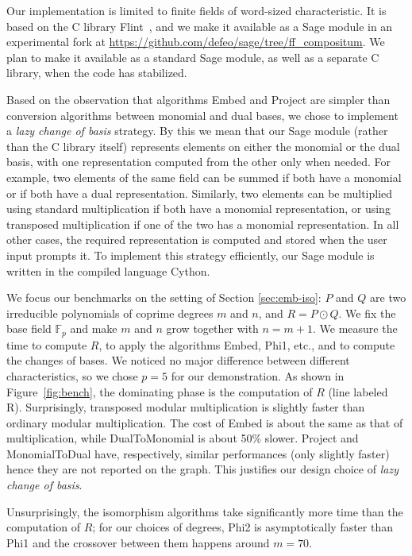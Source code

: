 \documentclass{sig-alternate}
\def\F {\ensuremath{\mathbb{F}}}
\newcounter{algo}
\begin{document}
Our implementation is limited to finite fields of word-sized
characteristic.  It is based on the C library
Flint~\cite{hart2010flint}, and we make it available as a Sage module
in an experimental fork at
\url{https://github.com/defeo/sage/tree/ff_compositum}. We plan to
make it available as a standard Sage module, as well as a separate C
library, when the code has stabilized.

Based on the observation that algorithms {\sf Embed} and {\sf Project}
are simpler than conversion algorithms between monomial and dual
bases, we chose to implement a \emph{lazy change of basis}
strategy. By this we mean that our Sage module (rather than the C
library itself) represents elements on either the monomial or the dual
basis, with one representation computed from the other only when
needed. For example, two elements of the same field can be summed if
both have a monomial or if both have a dual representation. Similarly,
two elements can be multiplied using standard multiplication if both
have a monomial representation, or using transposed multiplication if
one of the two has a monomial representation. In all other cases, the
required representation is computed and stored when the user input
prompts it. To implement this strategy efficiently, our Sage module is
written in the compiled language Cython.

We focus our benchmarks on the setting of Section \ref{sec:emb-iso}:
$P$ and $Q$ are two irreducible polynomials of coprime degrees $m$ and
$n$, and $R=P\odot Q$. We fix the base field $\F_p$ and make $m$ and
$n$ grow together with $n=m+1$. We measure the time to compute $R$, to
apply the algorithms {\sf Embed}, {\sf Phi1}, etc., and to compute the
changes of bases. We noticed no major difference between different
characteristics, so we chose $p=5$ for our demonstration. As shown in
Figure~\ref{fig:bench}, the dominating phase is the computation of $R$
(line labeled {\sf R}). Surprisingly, transposed modular
multiplication is slightly faster than ordinary modular
multiplication. The cost of {\sf Embed} is about the same as that of
multiplication, while {\sf DualToMonomial} is about 50\% slower. {\sf
  Project} and {\sf MonomialToDual} have, respectively, similar
performances (only slightly faster) hence they are not reported on the
graph. This justifies our design choice of \emph{lazy change of
  basis}.  

Unsurprisingly, the isomorphism algorithms take significantly more
time than the computation of $R$; for our choices of degrees, {\sf
  Phi2} is asymptotically faster than {\sf Phi1} and the crossover
between them happens around $m=70$. 
\end{document}

